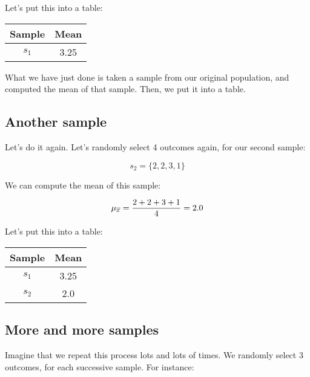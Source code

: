 \documentclass[../../../main.tex]{subfiles}
\begin{document}
\noindent
Let's put this into a table:

\begin{center}
  \begin{tabular}{| c | c |}
    \hline
    \textbf{Sample} & \textbf{Mean} \\ \hline
    $s_{1}$ & 3.25 \\ \hline
  \end{tabular}
\end{center}

\noindent
What we have just done is taken a sample from our original population, and computed the mean of that sample. Then, we put it into a table.


\subsection{Another sample}

Let's do it again. Let's randomly select 4 outcomes again, for our second sample:

\begin{equation*}
  s_{2} = \{ 2, 2, 3, 1 \}
\end{equation*}

\noindent
We can compute the mean of this sample:

\begin{equation*}
  \SamplingMean/ = \frac{2 + 2 + 3 + 1}{4} = 2.0
\end{equation*}

\noindent
Let's put this into a table:

\begin{center}
  \begin{tabular}{| c | c |}
    \hline
    \textbf{Sample} & \textbf{Mean} \\ \hline
    $s_{1}$ & 3.25 \\ \hline
    $s_{2}$ & 2.0 \\ \hline
  \end{tabular}
\end{center}


\subsection{More and more samples}

Imagine that we repeat this process lots and lots of times. We randomly select 3 outcomes, for each successive sample. For instance:
\end{document}
